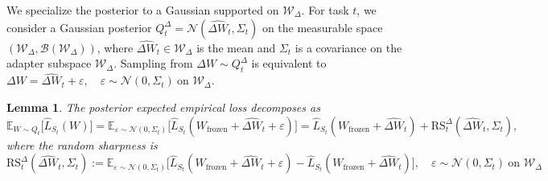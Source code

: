 \documentclass[10pt]{article} %
\newtheorem{lemma}{Lemma}
\begin{document}
We specialize the posterior to a Gaussian supported on $\mathcal W_\Delta$. For task $t$, we consider a Gaussian posterior \( Q_t^{\Delta} = \mathcal{N}(\hat{\Delta W}_t, \Sigma_t) \) on the measurable space \( (\mathcal{W}_\Delta, \mathcal{B}(\mathcal{W}_\Delta)) \), where \( \hat{\Delta W}_t \in \mathcal{W}_\Delta \) is the mean and \( \Sigma_t\) is a covariance on the adapter subspace \( \mathcal{W}_\Delta \). Sampling from \( \Delta W \sim Q_t^{\Delta} \) is equivalent to 
$
\Delta W = \hat{\Delta W}_t + \varepsilon, \quad \varepsilon \sim \mathcal{N}(0, \Sigma_t) \ \text{on } \mathcal{W}_\Delta.
$ 

\begin{lemma}
    The posterior expected empirical loss decomposes as
\begin{equation*}
    \mathbb{E}_{W\sim Q_t}\big[\hat{L}_{S_t}(W)\big]
= \mathbb{E}_{\varepsilon\sim\mathcal N(0,\Sigma_t)}
    \big[\hat{L}_{S_t}(W_\mathrm {frozen }+\hat{\Delta W}_t+\varepsilon)\big]
= \hat{L}_{S_t}(W_\mathrm {frozen }+\hat{\Delta W}_t)
  + \mathrm{RS}_t^{\Delta}(\hat{\Delta W}_t,\Sigma_t),
\end{equation*}
where the random sharpness is
$$
\mathrm{RS}_t^{\Delta}(\hat{\Delta W}_t,\Sigma_t)
:= \mathbb{E}_{\varepsilon\sim\mathcal N(0,\Sigma_t)}
   \big[\hat{L}_{S_t}(W_\mathrm {frozen }+\hat{\Delta W}_t+\varepsilon)
       - \hat{L}_{S_t}(W_\mathrm {frozen }+\hat{\Delta W}_t)\big],\quad
\varepsilon\sim\mathcal N(0,\Sigma_t)\ \text{on } \mathcal W_\Delta$$
\end{lemma}
\end{document}
